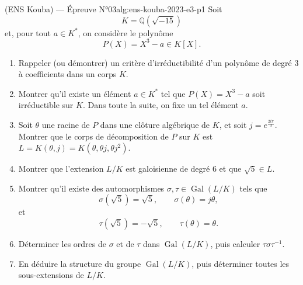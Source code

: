 \begin{problem}{(ENS Kouba) — Épreuve N°03}{alg:ens-kouba-2023-e3-p1}
Soit
$$
K=\mathbb{Q}(\sqrt{-15})
$$
et, pour tout $a\in K^*$, on considère le polynôme
$$
P(X)=X^3-a\in K[X].
$$
\begin{enumerate}
\item Rappeler (ou démontrer) un critère d'irréductibilité d'un polynôme de degré
      $3$ à coefficients dans un corps $K$.
\item Montrer qu'il existe un élément $a\in K^*$ tel que $P(X)=X^3-a$ soit
      irréductible sur $K$. Dans toute la suite, on fixe un tel élément $a$.
\item Soit $\theta$ une racine de $P$ dans une clôture algébrique de $K$, et soit
      $j=e^{\frac{2i\pi}{3}}$. Montrer que le corps de décomposition de $P$ sur $K$
      est $L=K(\theta,j)=K(\theta,\theta j,\theta j^2)$.
\item Montrer que l'extension $L/K$ est galoisienne de degré $6$ et que
      $\sqrt5\in L$.
\item Montrer qu'il existe des automorphismes $\sigma,\tau\in\operatorname{Gal}(L/K)$
      tels que
      $$
      \sigma(\sqrt5)=\sqrt5,\qquad \sigma(\theta)=j\theta,
      $$
      et
      $$
      \tau(\sqrt5)=-\sqrt5,\qquad \tau(\theta)=\theta.
      $$
\item Déterminer les ordres de $\sigma$ et de $\tau$ dans $\operatorname{Gal}(L/K)$,
      puis calculer $\tau\sigma\tau^{-1}$.
\item En déduire la structure du groupe $\operatorname{Gal}(L/K)$, puis déterminer
      toutes les sous-extensions de $L/K$.
\end{enumerate}

\end{problem}

\newpage

